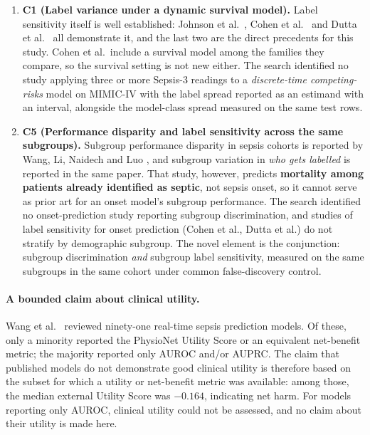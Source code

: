 \begin{enumerate}
    \item \textbf{C1 (Label variance under a dynamic survival model).} Label
    sensitivity itself is well established: Johnson et al.\
    \cite{johnson2018comparative}, Cohen et al.\ \cite{cohen2024subtle} and
    Dutta et al.\ \cite{dutta2026performance} all demonstrate it, and the last
    two are the direct precedents for this study. Cohen et al.\ include a
    survival model among the families they compare, so the survival setting is
    not new either. The search identified no study applying three or more
    Sepsis-3 readings to a \emph{discrete-time competing-risks} model on
    MIMIC-IV with the label spread reported as an estimand with an interval,
    alongside the model-class spread measured on the same test rows.

    \item \textbf{C5 (Performance disparity and label sensitivity across the
    same subgroups).} Subgroup performance disparity in sepsis cohorts is
    reported by Wang, Li, Naidech and Luo \cite{wang2022equity}, and subgroup
    variation in \emph{who gets labelled} is reported in the same paper. That
    study, however, predicts \textbf{mortality among patients already
    identified as septic}, not sepsis onset, so it cannot serve as prior art
    for an onset model's subgroup performance. The search identified no
    onset-prediction study reporting subgroup discrimination, and studies of
    label sensitivity for onset prediction (Cohen et al., Dutta et al.) do not
    stratify by demographic subgroup. The novel element is the conjunction:
    subgroup discrimination \emph{and} subgroup label sensitivity, measured on
    the same subgroups in the same cohort under common false-discovery
    control.
\end{enumerate}

\paragraph{A bounded claim about clinical utility.}
Wang et al.\ \cite{wang2025srpm} reviewed ninety-one real-time sepsis
prediction models. Of these, only a minority reported the PhysioNet Utility
Score or an equivalent net-benefit metric; the majority reported only AUROC
and/or AUPRC. The claim that published models do not demonstrate good clinical
utility is therefore based on the subset for which a utility or net-benefit
metric was available: among those, the median external Utility Score was
$-0.164$, indicating net harm. For models reporting only AUROC, clinical
utility could not be assessed, and no claim about their utility is made here.

